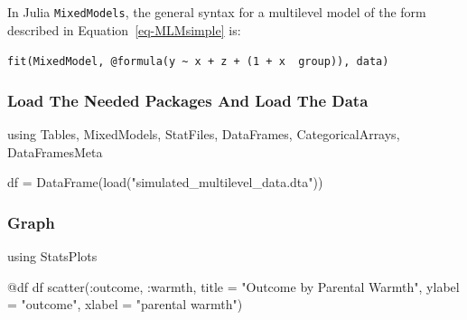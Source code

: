 \documentclass[
  letterpaper,
  DIV=11,
  numbers=noendperiod,
  oneside]{scrreprt}
\newenvironment{Shaded}{\begin{snugshade}}{\end{snugshade}}
\newcommand{\BuiltInTok}[1]{\textcolor[rgb]{0.00,0.23,0.31}{#1}}
\newcommand{\FunctionTok}[1]{\textcolor[rgb]{0.28,0.35,0.67}{#1}}
\newcommand{\ImportTok}[1]{\textcolor[rgb]{0.00,0.46,0.62}{#1}}
\newcommand{\NormalTok}[1]{\textcolor[rgb]{0.00,0.23,0.31}{#1}}
\newcommand{\OperatorTok}[1]{\textcolor[rgb]{0.37,0.37,0.37}{#1}}
\newcommand{\PreprocessorTok}[1]{\textcolor[rgb]{0.68,0.00,0.00}{#1}}
\newcommand{\StringTok}[1]{\textcolor[rgb]{0.13,0.47,0.30}{#1}}
\begin{document}
In Julia \texttt{MixedModels}, the general syntax for a multilevel model
of the form described in Equation~\ref{eq-MLMsimple} is:

\texttt{fit(MixedModel,\ @formula(y\ \textasciitilde{}\ x\ +\ z\ +\ (1\ +\ x\ \textbar{}\ group)),\ data)}

\hypertarget{load-the-needed-packages-and-load-the-data}{%
\subsubsection{Load The Needed Packages And Load The
Data}\label{load-the-needed-packages-and-load-the-data}}

\begin{Shaded}
\begin{Highlighting}[]
\ImportTok{using} \BuiltInTok{Tables}\NormalTok{, }\BuiltInTok{MixedModels}\NormalTok{, }\BuiltInTok{StatFiles}\NormalTok{, }\BuiltInTok{DataFrames}\NormalTok{, }\BuiltInTok{CategoricalArrays}\NormalTok{, }\BuiltInTok{DataFramesMeta}

\NormalTok{df }\OperatorTok{=} \FunctionTok{DataFrame}\NormalTok{(}\FunctionTok{load}\NormalTok{(}\StringTok{"simulated\_multilevel\_data.dta"}\NormalTok{))}
\end{Highlighting}
\end{Shaded}

\hypertarget{graph-2}{%
\subsubsection{Graph}\label{graph-2}}

\begin{Shaded}
\begin{Highlighting}[]
\ImportTok{using} \BuiltInTok{StatsPlots}

\PreprocessorTok{@df}\NormalTok{ df }\FunctionTok{scatter}\NormalTok{(}\OperatorTok{:}\NormalTok{outcome, }\OperatorTok{:}\NormalTok{warmth, }
\NormalTok{               title }\OperatorTok{=} \StringTok{"Outcome by Parental Warmth"}\NormalTok{,}
\NormalTok{               ylabel }\OperatorTok{=} \StringTok{"outcome"}\NormalTok{,}
\NormalTok{               xlabel }\OperatorTok{=} \StringTok{"parental warmth"}\NormalTok{)}
\end{Highlighting}
\end{Shaded}
\end{document}
